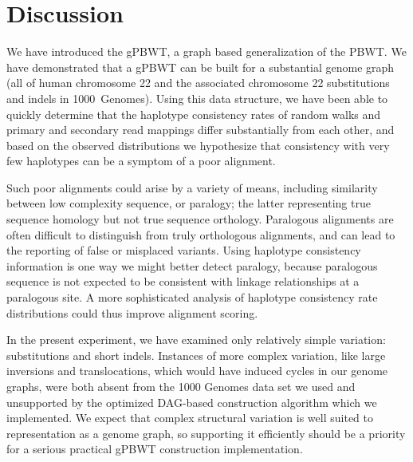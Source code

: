 \section{Discussion}

We have introduced the gPBWT, a graph based generalization of the PBWT. We have demonstrated that a gPBWT can be built for a substantial genome graph (all of human chromosome 22 and the associated chromosome 22 substitutions and indels in 1000~Genomes). Using this data structure, we have been able to quickly determine that the haplotype consistency rates of random walks and primary and secondary read mappings differ substantially from each other, and based on the observed distributions we hypothesize that consistency with very few haplotypes can be a symptom of a poor alignment. 

Such poor alignments could arise by a variety of means, including similarity between low complexity sequence, or paralogy; the latter representing true sequence homology but not true sequence orthology. Paralogous alignments are often difficult to distinguish from truly orthologous alignments, and can lead to the reporting of false or misplaced variants. Using haplotype consistency information is one way we might better detect paralogy, because paralogous sequence is not expected to be consistent with linkage relationships at a paralogous site. A more sophisticated analysis of haplotype consistency rate distributions could thus improve alignment scoring.

\begin{sloppypar}
In the present experiment, we have examined only relatively simple variation: substitutions and short indels. Instances of more complex variation, like large inversions and translocations, which would have induced cycles in our genome graphs, were both absent from the 1000 Genomes data set we used and unsupported by the optimized DAG-based construction algorithm which we implemented. We expect that complex structural variation is well suited to representation as a genome graph, so supporting it efficiently should be a priority for a serious practical gPBWT construction implementation.
\end{sloppypar}

